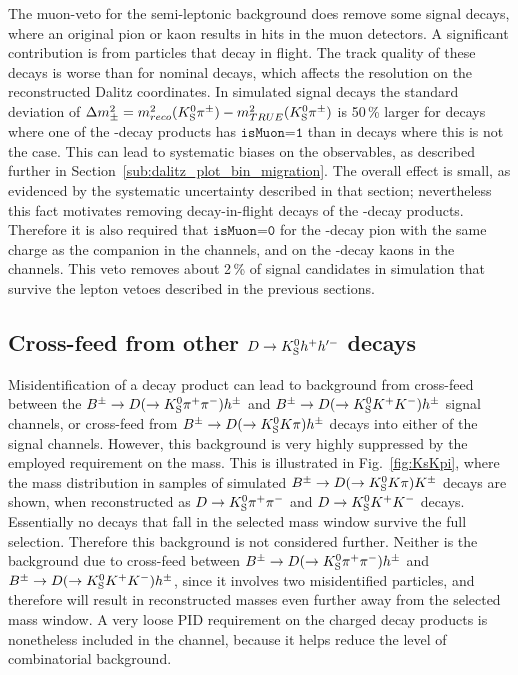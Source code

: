 

The muon-veto for the semi-leptonic background does remove some signal decays, where an original pion or kaon results in hits in the muon detectors. A significant contribution is from particles that decay in flight. The track quality of these decays is worse than for nominal decays, which affects the resolution on the reconstructed Dalitz coordinates. In simulated signal decays the standard deviation of $\Delta m^2_\pm = m^2_{reco}({{K}^0_{\mathrm{S}}}{{\pi}^\pm})-m^2_{TRUE}({{K}^0_{\mathrm{S}}}{{\pi}^\pm})$ is 50\,\% larger for decays where one of the \D-decay products has $\texttt{isMuon=1}$ than in decays where this is not the case. This can lead to systematic biases on the observables, as described further in Section~\ref{sub:dalitz_plot_bin_migration}. The overall effect is small, as evidenced by the systematic uncertainty described in that section; nevertheless this fact motivates removing decay-in-flight decays of the \D-decay products. Therefore it is also required that $\texttt{isMuon=0}$ for the \D-decay pion with the same charge as the companion in the \DtoKspipi channels, and on the \D-decay kaons in the \DtoKskk channels. This veto removes about 2\,\% of signal candidates in simulation that survive the lepton vetoes described in the previous sections.


\subsection{\texorpdfstring{Cross-feed from other ${D}\rightarrow{\ensuremath{{K}^0_{\mathrm{S}}}} h^+h'^-$ decays}{Cross-feed from other D->KShh' decays}} %
\label{sub:cross_feed_from_other_d_kshh_decays}

Misidentification of a \D decay product can lead to background from cross-feed between the ${{{B}^\pm}\rightarrow{\ensuremath{D}}(\rightarrow{\ensuremath{{K}^0_{\mathrm{S}}}}{\ensuremath{{\pi}^+}}{\ensuremath{{\pi}^-}})h^\pm}$ and ${{{B}^\pm}\rightarrow{\ensuremath{D}}(\rightarrow{\ensuremath{{K}^0_{\mathrm{S}}}}{\ensuremath{{K}^+}}{\ensuremath{{K}^-}})h^\pm}$ signal channels, or cross-feed from ${{{B}^\pm}\rightarrow{\ensuremath{D}}(\rightarrow{\ensuremath{{K}^0_{\mathrm{S}}}}{\ensuremath{K}}\pi)h^\pm}$ decays into either of the signal channels. However, this background is very highly suppressed by the employed requirement on the \D mass. This is illustrated in Fig.~\ref{fig:KsKpi}, where the \D mass distribution in samples of simulated ${{B}^\pm}\rightarrow{\ensuremath{D}}(\rightarrow{\ensuremath{{K}^0_{\mathrm{S}}}}{\ensuremath{K}}\pi){K}^\pm$  decays are shown, when reconstructed as ${D}\rightarrow{\ensuremath{{K}^0_{\mathrm{S}}}}{\ensuremath{{\pi}^+}}{\ensuremath{{\pi}^-}}$ and ${D}\rightarrow{\ensuremath{{K}^0_{\mathrm{S}}}}{\ensuremath{{K}^+}}{\ensuremath{{K}^-}}$ decays. Essentially no decays that fall in the selected \D mass window survive the full selection. Therefore this background is not considered further. Neither is the background due to cross-feed between ${{B}^\pm}\rightarrow{\ensuremath{D}}(\rightarrow{\ensuremath{{K}^0_{\mathrm{S}}}}{\ensuremath{{\pi}^+}}{\ensuremath{{\pi}^-}})h^\pm$ and ${{B}^\pm}\rightarrow{\ensuremath{D}}(\rightarrow{\ensuremath{{K}^0_{\mathrm{S}}}}{\ensuremath{{K}^+}}{\ensuremath{{K}^-}})h^\pm$, since it involves two misidentified particles, and therefore will result in reconstructed \D masses even further away from the selected mass window. A very loose PID requirement on the charged \D decay products is nonetheless included in the \DtoKsKK channel, because it helps reduce the level of combinatorial background.

